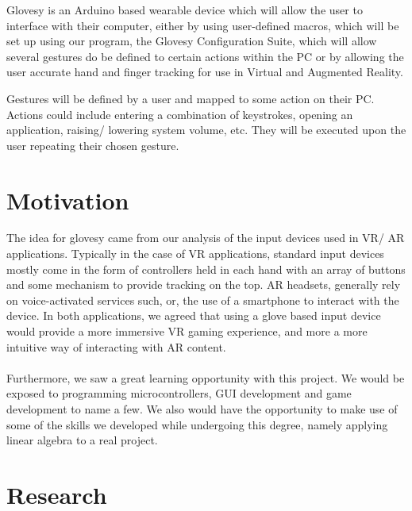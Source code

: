 \documentclass[12pt,a4paper,oneside]{book}
\theoremstyle{plain}
\numberwithin{equation}{chapter}
\newcounter{Chapnum}
\begin{document}
\noindent Glovesy is an Arduino based wearable device which will allow the user to interface with their computer, either by using user-defined macros, which will be set up using our program, the Glovesy Configuration Suite, which will allow several gestures do be defined to certain actions within the PC or by allowing the user accurate hand and finger tracking for use in Virtual and Augmented Reality.

\vspace{1cm}

\noindent Gestures will be defined by a user and mapped to some action on their PC. Actions could include entering a combination of keystrokes, opening an application, raising/ lowering system volume, etc. They will be executed upon the user repeating their chosen gesture.

\vspace{1cm}


\chapter*{\textbf{Motivation}}

\noindent The idea for glovesy came from our analysis of the input devices used in VR/ AR applications. Typically in the case of VR applications, standard input devices mostly come in the form of controllers held in each hand with an array of buttons and some mechanism to provide tracking on the top. AR headsets, generally rely on voice-activated services such, or, the use of a smartphone to interact with the device. In both applications, we agreed that using a glove based input device would provide a more immersive VR gaming experience, and more a more intuitive way of interacting with AR content.\\\\ Furthermore, we saw a great learning opportunity with this project. We would be exposed to programming microcontrollers, GUI development and game development to name a few. We also would have the opportunity to make use of some of the skills we developed while undergoing this degree, namely applying linear algebra to a real project.

\chapter*{\textbf{Research}}
\end{document}
